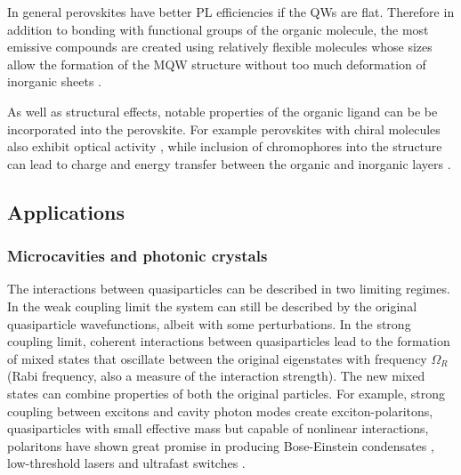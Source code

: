 In general perovskites have better PL efficiencies if the QWs are flat. Therefore in addition to bonding with functional groups of the organic molecule, the most emissive compounds are created using relatively flexible molecules whose sizes allow the formation of the MQW structure without too much deformation of inorganic sheets \cite{Zhang2009}.

As well as structural effects, notable properties of the organic ligand can be be incorporated into the perovskite. For example perovskites with chiral molecules also exhibit optical activity \cite{Teshima2003}, while inclusion of chromophores into the structure can lead to charge and energy transfer between the organic and inorganic layers \cite{Kawabata2009, Mitzi1999a, Braun1999}.

\subsection{Applications}
\subsubsection{Microcavities and photonic crystals}
The interactions between quasiparticles can be described in two limiting regimes. In the weak coupling limit the system can still be described by the original quasiparticle wavefunctions, albeit with some perturbations. In the strong coupling limit, coherent interactions between quasiparticles lead to the formation of mixed states that oscillate between the original eigenstates with frequency $\Omega_R$ (Rabi frequency, also a measure of the interaction strength). The new mixed states can combine properties of both the original particles. For example, strong coupling between excitons and cavity photon modes create exciton-polaritons, quasiparticles with small effective mass but capable of nonlinear interactions, polaritons have shown great promise in producing Bose-Einstein condensates \cite{Kasprzak2006}, low-threshold lasers \cite{Christopoulos2007} and ultrafast switches \cite{Amo2010}.

